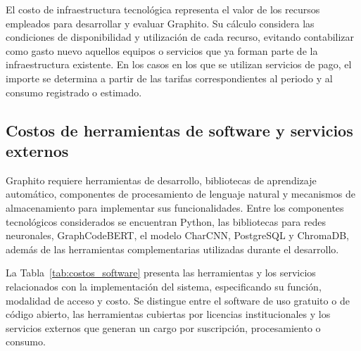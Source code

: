 El costo de infraestructura tecnológica representa el valor de los recursos empleados para desarrollar y evaluar Graphito. Su cálculo considera las condiciones de disponibilidad y utilización de cada recurso, evitando contabilizar como gasto nuevo aquellos equipos o servicios que ya forman parte de la infraestructura existente. En los casos en los que se utilizan servicios de pago, el importe se determina a partir de las tarifas correspondientes al periodo y al consumo registrado o estimado.

\subsection{Costos de herramientas de software y servicios externos}

Graphito requiere herramientas de desarrollo, bibliotecas de aprendizaje automático, componentes de procesamiento de lenguaje natural y mecanismos de almacenamiento para implementar sus funcionalidades. Entre los componentes tecnológicos considerados se encuentran Python, las bibliotecas para redes neuronales, GraphCodeBERT, el modelo CharCNN, PostgreSQL y ChromaDB, además de las herramientas complementarias utilizadas durante el desarrollo.

La Tabla~\ref{tab:costos_software} presenta las herramientas y los servicios relacionados con la implementación del sistema, especificando su función, modalidad de acceso y costo. Se distingue entre el software de uso gratuito o de código abierto, las herramientas cubiertas por licencias institucionales y los servicios externos que generan un cargo por suscripción, procesamiento o consumo.

